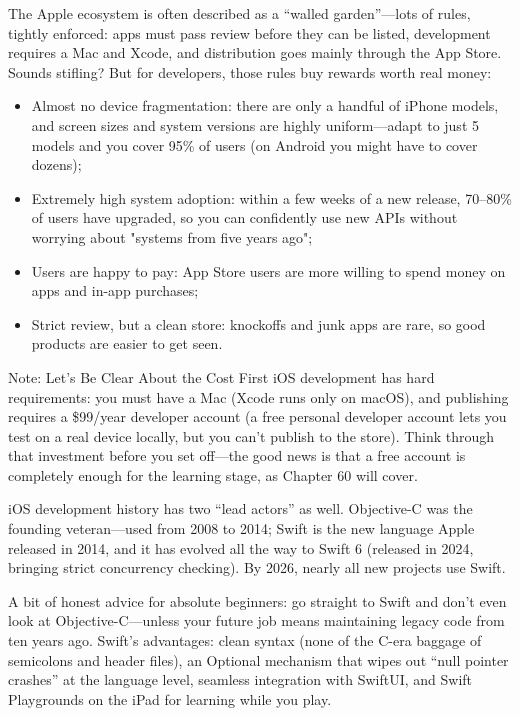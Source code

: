 
The Apple ecosystem is often described as a “walled garden”—lots of rules, tightly enforced: apps must pass review before they can be listed, development requires a Mac and Xcode, and distribution goes mainly through the App Store. Sounds stifling? But for developers, those rules buy rewards worth real money:

\begin{itemize}
  \item Almost no device fragmentation: there are only a handful of iPhone models, and screen sizes and system versions are highly uniform—adapt to just 5 models and you cover 95\% of users (on Android you might have to cover dozens);
  \item Extremely high system adoption: within a few weeks of a new release, 70–80\% of users have upgraded, so you can confidently use new APIs without worrying about "systems from five years ago";
  \item Users are happy to pay: App Store users are more willing to spend money on apps and in-app purchases;
  \item Strict review, but a clean store: knockoffs and junk apps are rare, so good products are easier to get seen.
\end{itemize}

\begin{tcbwarn}{Note: Let's Be Clear About the Cost First}
iOS development has hard requirements: you must have a Mac (Xcode runs only on macOS), and publishing requires a \$99/year developer account (a free personal developer account lets you test on a real device locally, but you can't publish to the store). Think through that investment before you set off—the good news is that a free account is completely enough for the learning stage, as Chapter 60 will cover.

\end{tcbwarn}


iOS development history has two “lead actors” as well. Objective-C was the founding veteran—used from 2008 to 2014; Swift is the new language Apple released in 2014, and it has evolved all the way to Swift 6 (released in 2024, bringing strict concurrency checking). By 2026, nearly all new projects use Swift.

A bit of honest advice for absolute beginners: go straight to Swift and don't even look at Objective-C—unless your future job means maintaining legacy code from ten years ago. Swift's advantages: clean syntax (none of the C-era baggage of semicolons and header files), an Optional mechanism that wipes out “null pointer crashes” at the language level, seamless integration with SwiftUI, and Swift Playgrounds on the iPad for learning while you play.

